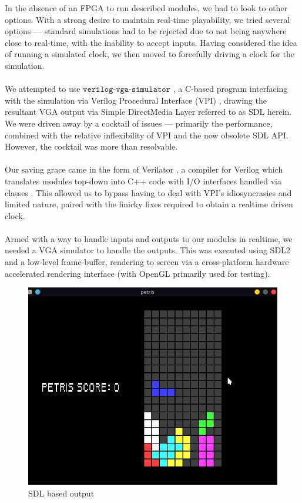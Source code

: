 In the absence of an FPGA to run described modules, 
we had to look to other options. With a strong desire to 
maintain real-time playability, we tried several options ---
standard simulations had to be rejected due to not being 
anywhere close to real-time, with the inability to accept inputs.
Having considered the idea of running a simulated clock, we then
moved to forcefully driving a clock for the simulation.
\\
\\
 We attempted to use \(\texttt{verilog-vga-simulator}\) \cite{vga-simulator},
a C-based program interfacing with the simulation via 
Verilog Procedural Interface (VPI) \cite{vpi}, drawing the resultant
VGA output via Simple DirectMedia Layer \cite{sdl} referred to as 
SDL herein. We were driven away by a cocktail of issues --- primarily
the performance, combined with the relative inflexibility of VPI 
and the now obsolete \cite{sdl_obsolete} SDL API. However, the cocktail
was more than resolvable. 
\\
\\
Our saving grace came in the form of Verilator \cite{verilator}, a compiler for
Verilog which translates modules top-down into C++ code with
I/O interfaces handled via classes \cite{verilator-implement}. This allowed
us to bypass having to deal with VPI's idiosyncrasies and limited nature, paired
with the finicky fixes required to obtain a realtime driven clock.
\\
\\
Armed with a way to handle inputs and outputs to our modules in realtime, we 
needed a VGA simulator to handle the outputs. This was executed using
SDL2 \cite{sdl2} and a low-level frame-buffer, rendering to screen via 
a cross-platform hardware accelerated rendering interface (with OpenGL \cite{opengl}
primarily used for testing).

\begin{figure}[h]
    \centering
    \includegraphics[scale=0.6]{fig/ouput_screenshot.png}
    \caption{SDL based output}
\label{fig:output}
\end{figure}

